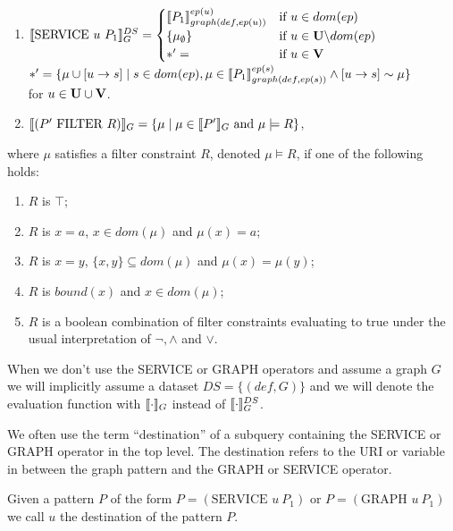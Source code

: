 \begin{definition}
\begin{enumerate}
			\item $\llbracket \mbox{SERVICE } u \ P_1 \rrbracket_G^{DS}  = 
				\begin{cases} 
					\llbracket P_1\rrbracket_{graph(def,ep(u))}^{ep(u)} &\mbox{if } u \in dom(ep)\\	
					\{ \mu_\emptyset\} & \mbox{if } u \in \mathbf{U} \backslash dom(ep)\\
					*'=	   & \mbox{if } u \in \mathbf{V}
					\end{cases}$\\
					$*'=\{\mu \cup [u \rightarrow s ] \mid s \in dom(ep), \mu
						\in \llbracket P_1 \rrbracket^{ep(s)}_{graph(def,ep(s))} \land [u \rightarrow s ] \sim \mu
					\}$\\ 
					for $u \in \mathbf{U} \cup \mathbf{V}$.
				\item $\llbracket (P' \mbox{ FILTER } R) \rrbracket_G = \{ \mu \mid \mu \in \llbracket P'
					\rrbracket_G \mbox{ and } \mu \models R \}$,
			\end{enumerate}
		where $\mu$ satisfies a filter constraint $R$, denoted $\mu \models R$,
		if one of the following holds:
		\begin{enumerate}
			\item $R$ is $\top$;
			\item $R$ is $x = a$, $x \in dom(\mu)$ and $\mu(x) = a$;
			\item $R$ is $x = y$, $\{x,y\} \subseteq dom(\mu)$ and $\mu(x) =
				\mu(y)$;
			\item $R$ is $bound(x)$ and $x \in dom(\mu)$;
			\item $R$ is a boolean combination of filter constraints evaluating
				to true under the usual interpretation of $\neg,\land$ and
				$\lor$.
		\end{enumerate}
		\end{definition}

		When we don't use the SERVICE or GRAPH operators and assume a graph $G$
		we will implicitly assume a dataset $DS = \{(def,G)\}$ and
		we will denote the evaluation function with $\llbracket \cdot \rrbracket_G$ instead
		of $\llbracket \cdot \rrbracket^{DS}_G$.

		We often use the term ``destination'' of a subquery containing the SERVICE or
		GRAPH operator in the top level.
		The destination refers to the URI or variable in between the graph
		pattern and the GRAPH or SERVICE operator.

		\begin{definition}
			Given a pattern $P$ of the form $P = (\mbox{SERVICE } u \ P_1)$ or
			$P	= (\mbox{GRAPH } u \ P_1)$ we call $u$ the
			destination of the pattern $P$.
		\end{definition}

